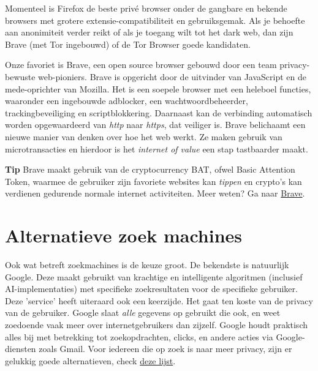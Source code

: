 \begin{quotation}
       \textit{}
\end{quotation}

\medskip

Momenteel is Firefox de beste priv{\'e} browser onder de gangbare en bekende browsers met grotere extensie-compatibiliteit en gebruiksgemak. Als je behoefte aan anonimiteit verder reikt of als je toegang wilt tot het dark web, dan zijn Brave (met Tor ingebouwd) of de Tor Browser goede kandidaten.

Onze favoriet is Brave, een open source browser gebouwd door een team privacy-bewuste web-pioniers. Brave is opgericht door de uitvinder van JavaScript en de mede-oprichter van Mozilla. Het is een soepele browser met een heleboel functies, waaronder een ingebouwde adblocker, een wachtwoordbeheerder, trackingbeveiliging en scriptblokkering. Daarnaast kan de verbinding automatisch worden opgewaardeerd van \emph{http} naar \emph{https}, dat veiliger is. Brave belichaamt een nieuwe manier van denken over hoe het web werkt. Ze maken gebruik van microtransacties en hierdoor is het \emph{internet of value} een stap tastbaarder maakt.\medskip

\begin{tipbox}{\textbf{Tip}}
    Brave maakt gebruik van de cryptocurrency BAT, ofwel Basic Attention Token, waarmee de gebruiker zijn favoriete websites kan \emph{tippen} en crypto's kan verdienen gedurende normale internet activiteiten. 
    \tcblower
    Meer weten? Ga naar \href{https://brave.com/urm569}{Brave}.
\end{tipbox}

\section{Alternatieve zoek machines}
Ook wat betreft zoekmachines is de keuze groot. De bekendste is natuurlijk Google. Deze maakt gebruikt van krachtige en intelligente algoritmen (inclusief AI-implementaties) met specifieke zoekresultaten voor de specifieke gebruiker. Deze 'service' heeft uiteraard ook een keerzijde. Het gaat ten koste van de privacy van de gebruiker. Google slaat \emph{alle} gegevens op gebruikt die ook, en weet zoedoende vaak meer over internetgebruikers dan zijzelf. Google houdt praktisch alles bij met betrekking tot zoekopdrachten, clicks, en andere acties via Google-diensten zoals Gmail. Voor iedereen die op zoek is naar meer privacy, zijn er gelukkig goede alternatieven, check \href{https://itsfoss.com/privacy-search-engines/}{deze lijst}.\medskip


